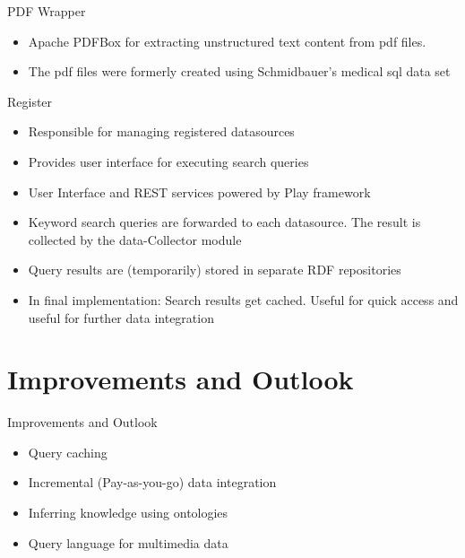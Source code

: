\begin{frame}{PDF Wrapper}
    \begin{itemize}
    \item Apache PDFBox \cite{PDFBox} for extracting unstructured text content from pdf files.
    \item The pdf files were formerly created using Schmidbauer's medical sql data set \cite{SchmidbauerBachelorThesis}
    \end{itemize}
\end{frame}

\begin{frame}{Register}
    \begin{itemize}
    \item Responsible for managing registered datasources
    \item Provides user interface for executing search queries
    \item User Interface and REST services powered by Play framework \cite{Play}
    \item Keyword search queries are forwarded to each datasource. The result is collected by the 
    data-Collector module
    \item Query results are (temporarily) stored in separate RDF repositories
    \item In final implementation: Search results get cached. Useful for quick access and useful for further data integration
    \end{itemize}
\end{frame}


\section{Improvements and Outlook}
\begin{frame}{Improvements and Outlook}
    \begin{itemize}
    \item Query caching
    \item Incremental (Pay-as-you-go) data integration
	\item Inferring knowledge using ontologies    
    \item Query language for multimedia data \cite{6214725}
    \end{itemize}    
\end{frame}